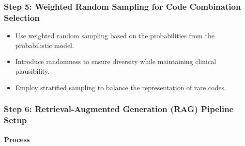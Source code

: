\documentclass[12pt, a4paper]{article}
\begin{document}
\subsubsection{Step 5: Weighted Random Sampling for Code Combination Selection}

\begin{itemize}
    \item Use weighted random sampling based on the probabilities from the probabilistic model.
    \item Introduce randomness to ensure diversity while maintaining clinical plausibility.
    \item Employ stratified sampling to balance the representation of rare codes.
\end{itemize}

\subsubsection{Step 6: Retrieval-Augmented Generation (RAG) Pipeline Setup}

\paragraph{Process}
\end{document}

